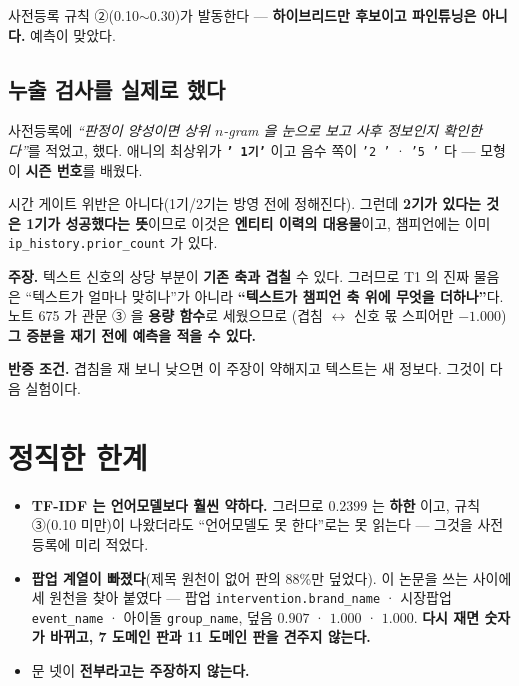 \documentclass[10pt,a4paper]{article}
\newcommand{\claim}[2]{\begin{claimbox}\textbf{주장.} #1\par\smallskip
  \textcolor{gray!70}{\textbf{반증 조건.} #2}\end{claimbox}}
\begin{document}
사전등록 규칙 ②(0.10$\sim$0.30)가 발동한다 --- \textbf{하이브리드만 후보이고
파인튜닝은 아니다.} 예측이 맞았다.

\subsection*{누출 검사를 실제로 했다}

사전등록에 \emph{``판정이 양성이면 상위 $n$-gram 을 눈으로 보고 사후 정보인지
확인한다''}를 적었고, 했다. 애니의 최상위가 \textbf{\texttt{' 1기'}} 이고 음수 쪽이
\texttt{'2 '} · \texttt{'5 '} 다 --- 모형이 \textbf{시즌 번호}를 배웠다.

시간 게이트 위반은 아니다(1기/2기는 방영 전에 정해진다). 그런데 \textbf{2기가 있다는
것은 1기가 성공했다는 뜻}이므로 이것은 \textbf{엔티티 이력의 대용물}이고, 챔피언에는
이미 \texttt{ip\_history.prior\_count} 가 있다.

\claim{텍스트 신호의 상당 부분이 \textbf{기존 축과 겹칠} 수 있다. 그러므로 T1 의
진짜 물음은 ``텍스트가 얼마나 맞히나''가 아니라 \textbf{``텍스트가 챔피언 축 위에
무엇을 더하나''}다. 노트 675 가 관문 ③ 을 \textbf{용량 함수}로 세웠으므로
(겹침 $\leftrightarrow$ 신호 몫 스피어만 $-1.000$) \textbf{그 증분을 재기 전에
예측을 적을 수 있다.}}
{겹침을 재 보니 낮으면 이 주장이 약해지고 텍스트는 새 정보다. 그것이 다음 실험이다.}

\section{정직한 한계}

\begin{itemize}
\item \textbf{TF-IDF 는 언어모델보다 훨씬 약하다.} 그러므로 $0.2399$ 는 \textbf{하한}
      이고, 규칙 ③(0.10 미만)이 나왔더라도 ``언어모델도 못 한다''로는 못 읽는다 ---
      그것을 사전등록에 미리 적었다.
\item \textbf{팝업 계열이 빠졌다}(제목 원천이 없어 판의 88\%만 덮었다). 이 논문을
      쓰는 사이에 세 원천을 찾아 붙였다 --- 팝업 \verb|intervention.brand_name| ·
      시장팝업 \verb|event_name| · 아이돌 \verb|group_name|, 덮음 $0.907$ · $1.000$ ·
      $1.000$. \textbf{다시 재면 숫자가 바뀌고, 7 도메인 판과 11 도메인 판을 견주지
      않는다.}
\item 문 넷이 \textbf{전부라고는 주장하지 않는다.}
\end{itemize}
\end{document}
